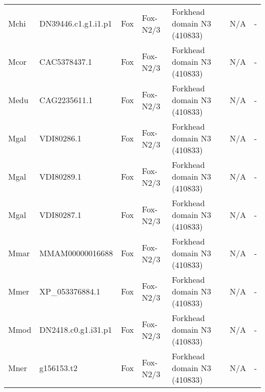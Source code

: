 \documentclass[../main.tex]{subfiles}
\begin{document}
\begin{landscape}
\begin{longtable}{lllllll}
		Mchi           & DN39446.c1.g1.i1.p1   & Fox            & Fox-N2/3            & Forkhead domain N3 (410833)                 & N/A                                                                    & -                    \\
		Mcor           & CAC5378437.1          & Fox            & Fox-N2/3            & Forkhead domain N3 (410833)                 & N/A                                                                    & -                    \\
		Medu           & CAG2235611.1          & Fox            & Fox-N2/3            & Forkhead domain N3 (410833)                 & N/A                                                                    & -                    \\
		Mgal           & VDI80286.1            & Fox            & Fox-N2/3            & Forkhead domain N3 (410833)                 & N/A                                                                    & -                    \\
		Mgal           & VDI80289.1            & Fox            & Fox-N2/3            & Forkhead domain N3 (410833)                 & N/A                                                                    & -                    \\
		Mgal           & VDI80287.1            & Fox            & Fox-N2/3            & Forkhead domain N3 (410833)                 & N/A                                                                    & -                    \\
		Mmar           & MMAM00000016688       & Fox            & Fox-N2/3            & Forkhead domain N3 (410833)                 & N/A                                                                    & -                    \\
		Mmer           & XP\_053376884.1       & Fox            & Fox-N2/3            & Forkhead domain N3 (410833)                 & N/A                                                                    & -                    \\
		Mmod           & DN2418.c0.g1.i31.p1   & Fox            & Fox-N2/3            & Forkhead domain N3 (410833)                 & N/A                                                                    & -                    \\
		Mner           & g156153.t2            & Fox            & Fox-N2/3            & Forkhead domain N3 (410833)                 & N/A                                                                    & -                    \\

\end{longtable}
\end{landscape}
\end{document}
